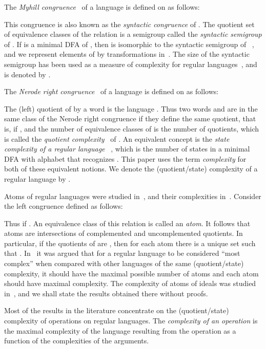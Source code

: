 \documentclass[final]{dmtcs-episciences}
\theoremstyle{definition}
\theoremstyle{remark}
\begin{document}
The \emph{Myhill congruence}~\cite{Myh57}  of a language  is defined on  as follows:

This congruence is also known as the \emph{syntactic congruence} of .
The quotient set  of equivalence classes of the relation  is a semigroup called the \emph{syntactic semigroup} of .
If   is a minimal DFA of , then  is isomorphic to the syntactic semigroup  of ~\cite{Pin97}, and we represent elements of  by transformations in~. 
The size of the syntactic semigroup has been used as a measure of complexity for regular languages~\cite{Brz13,BrYe11,HoKo04}, and is denoted by . 

The \emph{Nerode right congruence}~\cite{Ner58} of a language  is defined on  as follows:

The (left) quotient of  by a word  is the language 
.
Thus two words  and  are in the same class of the Nerode right congruence if they define the same quotient, that is, if , and  
the number of equivalence classes of  is the number of quotients, which is called the 
 \emph{quotient complexity}~\cite{Brz10} of .
An equivalent concept is
the \emph{state complexity of a regular language}~\cite{Yu01} , which  is the number of states in a minimal DFA with alphabet  that recognizes . 
This paper uses  the term \emph{complexity} for both of these equivalent notions.
We denote the (quotient/state) complexity of a regular language  by .

Atoms of regular languages were studied in~\cite{BrTa14}, and their complexities  
in~\cite{BrDa14,BrTa13,Iva16}.
Consider the left congruence defined as follows:

Thus  if . 
An equivalence class of this relation is called an \emph{atom}.
It follows that atoms are intersections of complemented and uncomplemented quotients.
In particular, if the quotients of  are , then for each atom  there is a unique set  such that
.
In~\cite{Brz13} it was argued that 
for a regular language to be considered ``most complex'' when compared with other languages of the same (quotient/state) complexity, it should have the maximal possible number of atoms and each atom should have maximal complexity.
The complexity of atoms of ideals was studied in~\cite{BrDa14,BrDa15}, and we shall  state the results obtained there without proofs.

Most of the results in the literature concentrate on the (quotient/state) complexity of operations on regular languages.
The \emph{complexity of an operation} is the maximal  complexity of the language resulting from the operation as a function of the  complexities of the arguments.
\end{document}
